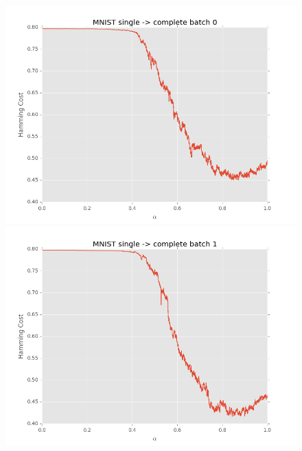 \begin{figure}[h]
\centering
\begin{minipage}{.3\textwidth}
  \centering
  \includegraphics[width=\linewidth]{images/mnist-sc-0}
\end{minipage}
\begin{minipage}{.3\textwidth}
  \centering
  \includegraphics[width=\linewidth]{images/mnist-sc-1}
\end{minipage}
\begin{minipage}{.3\textwidth}
  \centering

\end{minipage}
\end{figure}

